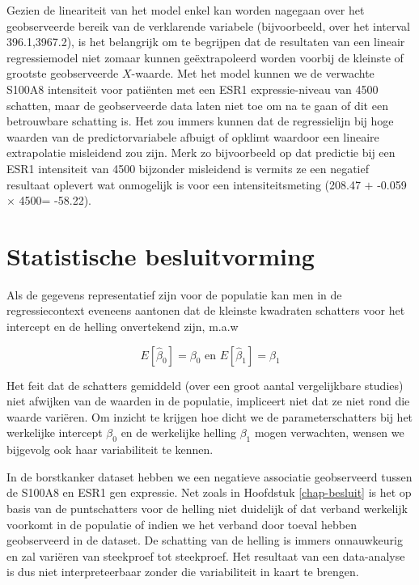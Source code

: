 \documentclass[
  12pt,dutch,coursenotes]{book}
\begin{document}
Gezien de lineariteit van het model enkel kan worden nagegaan over het
geobserveerde bereik van de verklarende variabele (bijvoorbeeld, over het
interval 396.1,3967.2), is het belangrijk om te begrijpen dat de resultaten van een lineair regressiemodel niet zomaar kunnen geëxtrapoleerd worden
voorbij de kleinste of grootste geobserveerde \(X\)-waarde.
Met het model kunnen we de verwachte S100A8 intensiteit voor patiënten met een
ESR1 expressie-niveau van 4500 schatten, maar de geobserveerde data laten niet toe om na te gaan of dit een
betrouwbare schatting is. Het zou immers kunnen dat de regressielijn bij hoge waarden van de predictorvariabele
afbuigt of opklimt waardoor een lineaire extrapolatie misleidend zou zijn.
Merk zo bijvoorbeeld op dat predictie bij een ESR1 intensiteit van 4500 bijzonder misleidend is vermits ze een negatief resultaat oplevert wat onmogelijk is voor een intensiteitsmeting (208.47 \(+\) -0.059 \(\times\) 4500= -58.22).

\hypertarget{sec:linBesluit}{%
\section{Statistische besluitvorming}\label{sec:linBesluit}}

Als de gegevens representatief zijn voor de populatie kan men in de regressiecontext eveneens aantonen dat de kleinste kwadraten schatters voor het intercept en de helling onvertekend zijn, m.a.w

\[E[\hat \beta_0]=\beta_0 \text{ en } E[\hat \beta_1]=\beta_1\]

Het feit dat de schatters gemiddeld (over een groot aantal vergelijkbare studies) niet afwijken van de waarden in de populatie, impliceert niet dat ze niet rond die waarde variëren.
Om inzicht te krijgen hoe dicht we de parameterschatters bij het werkelijke intercept \(\beta_0\) en de werkelijke helling \(\beta_1\) mogen verwachten, wensen we bijgevolg ook haar variabiliteit te kennen.

In de borstkanker dataset hebben we een negatieve associatie geobserveerd tussen de S100A8 en ESR1 gen expressie.
Net zoals in Hoofdstuk \ref{chap-besluit} is het op basis van de puntschatters voor de helling niet duidelijk of dat verband werkelijk voorkomt in de populatie of indien we het verband door toeval hebben geobserveerd in de dataset.
De schatting van de helling is immers onnauwkeurig en zal variëren van steekproef tot steekproef.
Het resultaat van een data-analyse is dus niet interpreteerbaar zonder die variabiliteit in kaart te brengen.
\end{document}
